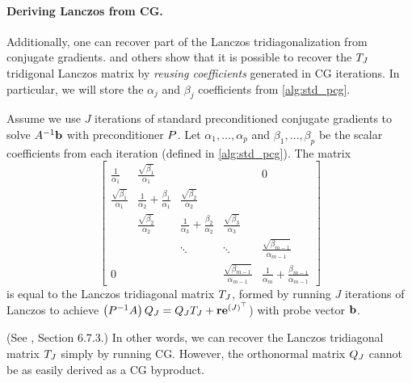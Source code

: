 \paragraph{Deriving Lanczos from CG.}
Additionally, one can recover part of the Lanczos tridiagonalization from conjugate gradients.
\citet{saad2003iterative} and others show that it is possible to recover the $T_J$ tridigonal Lanczos matrix by \emph{reusing coefficients} generated in CG iterations.
In particular, we will store the $\alpha_j$ and $\beta_j$ coefficients from \autoref{alg:std_pcg}.
%
\begin{observation}
  Assume we use $J$ iterations of standard preconditioned conjugate gradients to solve $A^{-1} \mathbf{b}$ with preconditioner $P$.
  Let $\alpha_1, \ldots, \alpha_p$ and $\beta_1, \ldots, \beta_p$ be the scalar coefficients from each iteration (defined in \autoref{alg:std_pcg}).
  The matrix
  \begin{equation*}
    \left[\begin{array}{ccccc}
      \frac{1}{\alpha_1} & \frac{\sqrt{\beta_1}}{\alpha_1} &  & & 0 \\
      \frac{\sqrt{\beta_1}}{\alpha_1} & \frac{1}{\alpha_2} + \frac{\beta_1}{\alpha_1} & \frac{\sqrt{\beta_2}}{\alpha_2} &  &  \\
      & \frac{\sqrt{\beta_2}}{\alpha_2} & \frac{1}{\alpha_3} + \frac{\beta_2}{\alpha_2} & \frac{\sqrt{\beta_3}}{\alpha_3} &  \\
      &       & \ddots & \ddots & \frac{\sqrt{\beta_{m-1}}}{\alpha_{m-1}} \\
      0 &       &        & \frac{\sqrt{\beta_{m-1}}}{\alpha_{m-1}} & \frac{1}{\alpha_m} + \frac{\beta_{m-1}}{\alpha_{m-1}}
    \end{array}\right]
  \end{equation*}
  is equal to the Lanczos tridiagonal matrix $T_J$, formed by running $J$ iterations of Lanczos to achieve $\left( P^{-1} A \right) Q_J = Q_J T_J + \mathbf{r} \mathbf{e}^{(J)^\top}$) with probe vector $\mathbf{b}$.
  \label{obs:lanczos_cg}
\end{observation}
(See \cite{saad2003iterative}, Section 6.7.3.)
In other words, we can recover the Lanczos tridiagonal matrix $T_J$ simply by running CG.
However, the orthonormal matrix $Q_J$ cannot be as easily derived as a CG byproduct.
